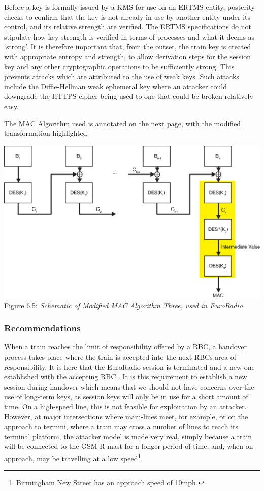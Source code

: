 \documentclass[twoside,11pt,a4paper]{article}
\begin{document}
Before a key is formally issued by a KMS for use on an ERTMS entity, posterity checks to confirm that the key is not already in use by another entity under its control, and its relative strength are verified. The ERTMS specifications do not stipulate how key strength is verified in terms of processes and what it deems as `strong'. It is therefore important that, from the outset, the train key is created with appropriate entropy and strength, to allow derivation steps for the session key and any other cryptographic operations to be sufficiently strong. This prevents attacks which are attributed to the use of weak keys. Such attacks include the Diffie-Hellman weak ephemeral key where an attacker could downgrade the HTTPS cipher being used to one that could be broken relatively easy.

The MAC Algorithm used is annotated on the next page, with the modified transformation highlighted.
\clearpage

\begin{center}
 \includegraphics[scale=0.5]{ModMacAlgo3.eps}\\
Figure 6.5: \textit{Schematic of Modified MAC Algorithm Three, used in EuroRadio}
\end{center}

\subsubsection{Recommendations}
When a train reaches the limit of responsibility offered by a RBC, a handover process takes place where the train is accepted into the next RBCs area of responsibility. It is here that the EuroRadio session is terminated and a new one established with the accepting RBC \citep[Section 3.15.1.3]{SUBSET-026-3}. It is this requirement to establish a new session during handover which means that we should not have concerns over the use of long-term keys, as session keys will only be in use for a short amount of time. On a high-speed line, this is not feasible for exploitation by an attacker. However, at major intersections where main-lines meet, for example, or on the approach to termini, where a train may cross a number of lines to reach its terminal platform, the attacker model is made very real, simply because a train will be connected to the GSM-R mast for a longer period of time, and, when on approach, may be travelling at a low speed\footnote{Birmingham New Street has an approach speed of 10mph \citep{NetworkRail15f}}.
\end{document}
